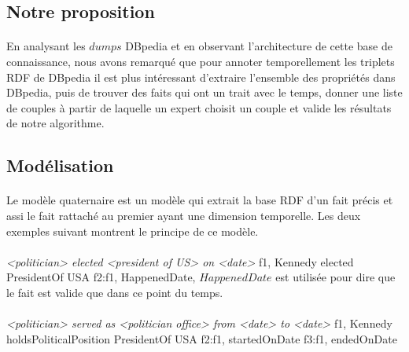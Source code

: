 \subsection{Notre proposition}
\paragraph{}
En analysant les $dumps$ DBpedia et en observant l'architecture de cette base de connaissance, nous avons remarqué que pour annoter temporellement les triplets RDF de DBpedia il est plus intéressant d'extraire l'ensemble des propriétés dans DBpedia, puis de trouver des faits qui ont un trait avec le temps, donner une liste de couples à partir de laquelle un expert choisit un couple et valide les résultats de notre algorithme.
\subsection{Modélisation}
\paragraph{}
Le modèle quaternaire est un modèle qui extrait la base RDF d'un fait précis et assi le fait rattaché au premier ayant une dimension temporelle. Les deux exemples suivant montrent le principe de ce modèle.
\paragraph{}
{\it <politician> elected <president of US> on <date>}
\newline
f1, Kennedy elected PresidentOf USA 
\newline
f2:f1, HappenedDate, $HappenedDate$ est utilisée pour dire que le fait est valide que dans ce point du temps.
\paragraph{}
{\it <politician> served as <politician office> from <date> to <date>}
\newline
f1, Kennedy holdsPoliticalPosition PresidentOf USA 
\newline
f2:f1, startedOnDate 
\newline
f3:f1, endedOnDate

